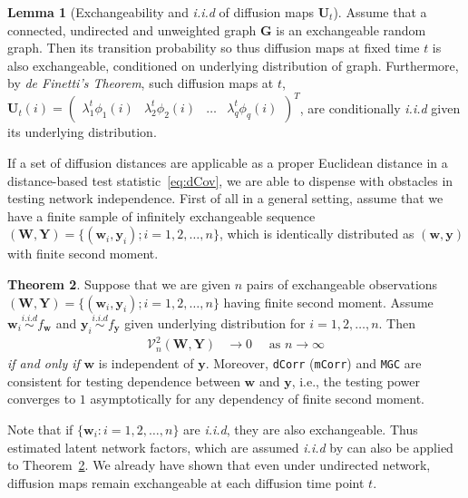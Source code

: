 \documentclass[11pt]{article}
\theoremstyle{definition}
\newtheorem{theorem}{Theorem}[section]
\newtheorem{lemma}[theorem]{Lemma}
\begin{document}
\begin{lemma}[Exchangeability and \textit{i.i.d} of diffusion maps $\mathbf{U}_{t}$]
	\label{main_lemma}
	Assume that a connected, undirected and unweighted graph $\mathbf{G}$ is an exchangeable random graph. Then its transition probability so thus diffusion maps at fixed time $t$ is also exchangeable, conditioned on underlying distribution of graph. Furthermore, by \textit{de Finetti's Theorem}, such diffusion maps at $t$, $\mathbf{U}_{t}(i) = \begin{pmatrix} \lambda^{t}_{1} \phi_{1}(i) & \lambda^{t}_{2} \phi_{2} (i)  & \ldots & \lambda^{t}_{q} \phi_{q}(i) \end{pmatrix}^{T}$, are conditionally \textit{i.i.d} given its underlying distribution.   
\end{lemma}

If a set of diffusion distances are applicable as a proper Euclidean distance in a distance-based test statistic~\ref{eq:dCov}, we are able to dispense with obstacles in testing network independence. First of all in a general setting, assume that we have a finite sample of infinitely exchangeable sequence $(\mathbf{W}, \mathbf{Y}) = \{  (\mathbf{w}_{i}, \mathbf{y}_{i} ) ; i = 1,2, \ldots, n \}$, which is identically distributed as $(\mathbf{w},\mathbf{y})$ with finite second moment.

\begin{theorem}
	Suppose that we are given $n$ pairs of exchangeable observations $(\mathbf{W}, \mathbf{Y}) = \{  (\mathbf{w}_{i}, \mathbf{y}_{i} ) ; i = 1,2, \ldots, n \}$ having finite second moment. Assume $\mathbf{w}_{i} \overset{i.i.d}{\sim} f_{\mathbf{w}}$ and $\mathbf{y}_{i} \overset{i.i.d}{\sim} f_{\mathbf{y}}$ given underlying distribution for $i = 1,2, \ldots, n$. Then
	\begin{eqnarray}
	\mathcal{V}_{n}^{2}(\mathbf{W},\mathbf{Y}) &\longrightarrow 0 \quad \mbox{ as } n \rightarrow \infty
	\end{eqnarray}	
	\textit{if and only if} $\mathbf{w}$ is independent of $\mathbf{y}$. Moreover, \texttt{dCorr} (\texttt{mCorr}) and \texttt{MGC} are consistent for testing dependence between $\mathbf{w}$ and $\mathbf{y}$, i.e., the testing power converges to $1$ asymptotically for any dependency of finite second moment.
	\label{theoremMain}
\end{theorem}

Note that if $\{ \mathbf{w}_{i} : i = 1,2,\ldots, n \}$ are \textit{i.i.d}, they are also exchangeable. Thus estimated latent network factors, which are assumed \textit{i.i.d} by \cite{fosdick2015testing} can also be applied to Theorem~\ref{theoremMain}. We already have shown that even under undirected network, diffusion maps remain exchangeable at each diffusion time point $t$. 
\end{document}
